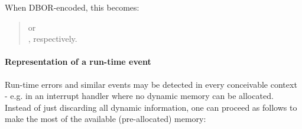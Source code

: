 \begin{BeginParPenalty}
    When DBOR-encoded, this becomes:
    \begin{quote}
        or \\
        \ByteSequence{
            \DborFirstByteHex{Number}{0C},
            \DborFirstByteHex{Dictionary}{A7}, %
                \DborFirstByteHex{Number}{03},
                \DborFirstByteHex{Number}{E9}, \DborNextByteHex{01},
                \DborFirstByteHex{Number}{09},
                \DborFirstByteHex{Number}{00},
                \DborFirstByteHex{Number}{0B},
                \DborFirstByteHex{Numberlike}{FE},
            \DborFirstByteHex{Number}{02}
        }, respectively.
    \end{quote}
\end{BeginParPenalty}

\paragraph{Representation of a run-time event}

Run-time errors and similar events may be detected in every conceivable context -
e.g. in an interrupt handler where no dynamic memory can be allocated.
Instead of just discarding all dynamic information, one can proceed as follows to make the most of the available
(pre-allocated) memory:

